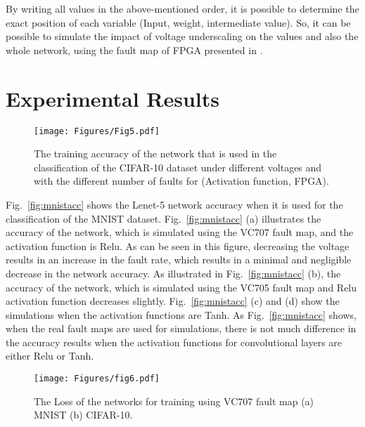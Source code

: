 \documentclass[conference]{IEEEtran}
\begin{document}
  By writing all values in the above-mentioned order, it is possible to determine the exact position of each variable (Input, weight, intermediate value). So, it can be possible to simulate the impact of voltage underscaling on the values and also the whole network, using the fault map of FPGA presented in \cite{fault-map}. 
  \color{black}
\color{black}
 

\color{black}
\section{Experimental Results}
\label{sec:results}




\begin{figure*}[h]
 \centering
\centerline{    \texttt{[image: Figures/Fig5.pdf]}}
\caption{The training accuracy of the network that is used in the classification of the CIFAR-10 dataset under different voltages and with the different number of faults for (Activation function, FPGA). }
\label{fig:cifaracc}
\end{figure*}
Fig.~\ref{fig:mnistacc} shows the Lenet-5 network accuracy when it is used for the classification of the MNIST dataset. Fig.~\ref{fig:mnistacc} (a) illustrates the accuracy of the network, which is simulated using the VC707 fault map, and the activation function is Relu. As can be seen in this figure, decreasing the voltage results in an increase in the fault rate, which results in a minimal and negligible decrease in the network accuracy. As illustrated in Fig.~\ref{fig:mnistacc} (b), the accuracy of the network, which is simulated using the VC705 fault map and Relu activation function decreases slightly. Fig.~\ref{fig:mnistacc} (c) and (d) show the simulations when the activation functions are Tanh. As Fig.~\ref{fig:mnistacc} shows, when the real fault maps are used for simulations, there is not much difference in the accuracy results when the activation functions for convolutional layers are either Relu or Tanh. \color{black}

  \begin{figure}[h]
 \centering
\centerline{    \texttt{[image: Figures/fig6.pdf]}}
\caption{The Loss of the networks for training using VC707 fault map (a) MNIST (b) CIFAR-10.}
\label{fig:Loss}
\end{figure}
\end{document}
